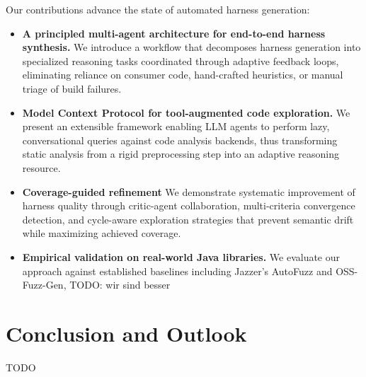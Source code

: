 \documentclass[sigconf,review,anonymous]{acmart}
\begin{document}
Our contributions advance the state of automated harness generation:
\begin{itemize}
    \item \textbf{A principled multi-agent architecture for end-to-end harness synthesis.} We introduce a workflow that decomposes harness generation into specialized reasoning tasks coordinated through adaptive feedback loops, eliminating reliance on consumer code, hand-crafted heuristics, or manual triage of build failures.

    \item \textbf{Model Context Protocol for tool-augmented code exploration.} We present an extensible framework enabling LLM agents to perform lazy, conversational queries against code analysis backends, thus transforming static analysis from a rigid preprocessing step into an adaptive reasoning resource.

    \item \textbf{Coverage-guided refinement} We demonstrate systematic improvement of harness quality through critic-agent collaboration, multi-criteria convergence detection, and cycle-aware exploration strategies that prevent semantic drift while maximizing achieved coverage.

    \item \textbf{Empirical validation on real-world Java libraries.} We evaluate our approach against established baselines including Jazzer's AutoFuzz and OSS-Fuzz-Gen, TODO: wir sind besser
\end{itemize}








\section{Conclusion and Outlook}
TODO




\end{document}
